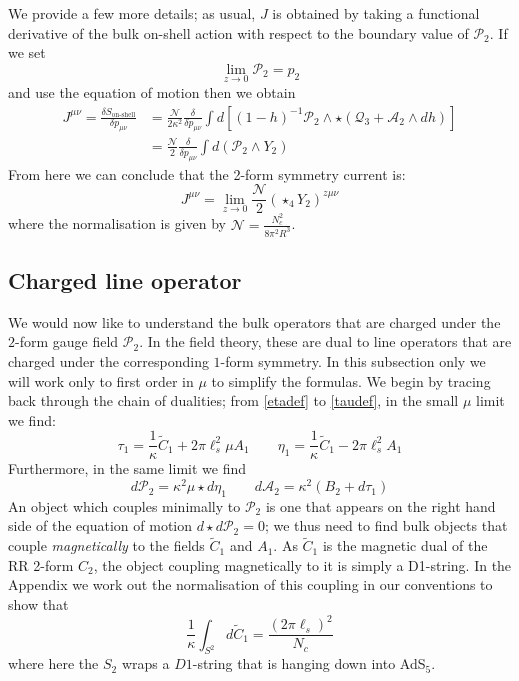 \documentclass[aps,preprint,nofootinbib,preprintnumbers,eqsecnum,superscriptaddress]{revtex4}
\def\le{\left}
\def\ri{\right}
\newcommand\sA{{\ensuremath{{\mathcal A}}}}
\newcommand\sN{{\ensuremath{{\mathcal N}}}}
\newcommand\sP{{\mathcal P}}
\newcommand{\ka}{{\kappa}}
\begin{document}
We provide a few more details; as usual, $J$ is obtained by taking a functional derivative of the bulk on-shell action with respect to the boundary value of $\mathcal{P}_2$. If we set 
\begin{equation}
	\lim_{z\to 0}{\mathcal{P}_2} = p_2
\end{equation}
and use the equation of motion then we obtain
\begin{align*}
	J^{\mu\nu} = \frac{\delta S_{\text{on-shell}}}{\delta p_{\mu\nu}}
	& = \frac{\mathcal{N}}{2 \kappa^2} \frac{\delta}{\delta p_{\mu\nu}} \int{d\left[(1-h)^{-1}\mathcal{P}_2 \wedge \star (\mathcal{Q}_3 + \mathcal{A}_2 \wedge dh)\right]}		\\
	& = \frac{\mathcal{N}}{2} \frac{\delta}{\delta p_{\mu\nu}} \int{d(\mathcal{P}_2 \wedge Y_2)}
\end{align*}
From here we can conclude that the 2-form symmetry current is: 
\begin{equation}
J^{\mu\nu} = \lim_{z \to 0} \frac{\sN}{2} \left(\star_{4} Y_2\right)^{z \mu \nu}
\end{equation}
where the normalisation is given by $\mathcal{N} = \frac{N_c^2}{8 \pi^2 R^3}$. 

\subsection{Charged line operator}
We would now like to understand the bulk operators that are charged under the $2$-form gauge field $\sP_{2}$. In the field theory, these are dual to line operators that are charged under the corresponding $1$-form symmetry. In this subsection only we will work only to first order in $\mu$ to simplify the formulas. We begin by tracing back through the chain of dualities; from \eqref{etadef} to \eqref{taudef}, in the small $\mu$ limit we find:
\begin{equation}
\tau_1 = \frac{1}{\ka} \tilde{C}_1 + 2\pi \ell_s^2 \mu A_1 \qquad
\eta_1 = \frac{1}{\ka} \tilde{C}_1 - 2\pi \ell_s^2 A_1 \label{allcoups} 
\end{equation}
Furthermore, in the same limit we find
\begin{equation}
d \sP_{2} = \ka^2 \mu \star d\eta_1 \qquad d\sA_{2} = \ka^2 \le(B_2 + d\tau_1\ri)	
\end{equation}
An object which couples minimally to $\sP_2$ is one that appears on the right hand side of the equation of motion $d \star d\sP_2 = 0$; we thus need to find bulk objects that couple {\it magnetically} to the fields $\tilde{C}_1$ and $A_1$. As $\tilde{C}_1$ is the magnetic dual of the RR 2-form $C_2$, the object coupling magnetically to it is simply a D1-string. In the Appendix we work out the normalisation of this coupling in our conventions to show that 
\begin{equation}
\frac{1}{\ka} \int_{S^2} d\tilde{C}_1 = \frac{(2\pi \ell_s)^2}{N_c} \label{D1coupling} 
\end{equation}
where here the $S_2$ wraps a $D1$-string that is hanging down into AdS$_5$. 
\end{document}
